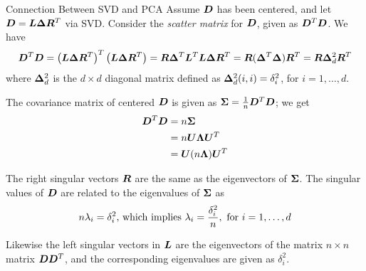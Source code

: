 \begin{frame}{Connection Between SVD and PCA}
  \small 
Assume ${\boldsymbol D}$ has been centered, and let ${\boldsymbol D} = {\boldsymbol L} {\bm \Delta} {\boldsymbol R}^T$ via
SVD. 
Consider the {\em scatter matrix} for ${\boldsymbol D}$, given as ${\boldsymbol D}^T{\boldsymbol D}$.
We have
\begin{align*}
    {\boldsymbol D}^T{\boldsymbol D}  = \left({\boldsymbol L} {\bm \Delta} {\boldsymbol R}^T\right)^T
         \left({\boldsymbol L} {\bm \Delta} {\boldsymbol R}^T \right)
         = {\boldsymbol R} {\bm \Delta}^T {\boldsymbol L}^T {\boldsymbol L} {\bm \Delta} {\boldsymbol R}^T
         = {\boldsymbol R} ({\bm \Delta}^T {\bm \Delta}) {\boldsymbol R}^T
         = {\boldsymbol R} {\bm \Delta}^2_d {\boldsymbol R}^T
\end{align*}
where ${\bm \Delta}^2_d$ is
the $d \times d$ diagonal matrix def\/{i}ned as
${\bm \Delta}^2_d(i,i) = \delta_i^2$, for
$i=1,\ldots,d$.

\medskip
The covariance matrix of centered ${\boldsymbol D}$ is given as
${\bm \Sigma} = {1\over n} {\boldsymbol D}^T{\boldsymbol D}$; we get
\begin{align*}
    {\boldsymbol D}^T{\boldsymbol D} & = n {\bm \Sigma}\nonumber\\
        & = n {\boldsymbol U} {\bm \Lambda} {\boldsymbol U}^T\nonumber\\
        & = {\boldsymbol U} (n {\bm \Lambda}) {\boldsymbol U}^T
\end{align*}

\medskip
The right singular vectors ${\boldsymbol R}$ are the same as
the eigenvectors of ${\bm \Sigma}$.
The singular values of ${\boldsymbol D}$ are
related to the eigenvalues of ${\bm \Sigma}$ as
\begin{align*}
n \lambda_i = \delta_i^2\nonumber
\text{, which implies } \lambda_i = {\delta_i^2 \over n},
\text{ for } i=1, \ldots, d
\end{align*}

\medskip
Likewise the left
singular vectors in ${\boldsymbol L}$ are the eigenvectors of the matrix $n
\times n$ matrix ${\boldsymbol D}{\boldsymbol D}^T$, and the corresponding eigenvalues
are given as $\delta^2_i$.
\end{frame}

